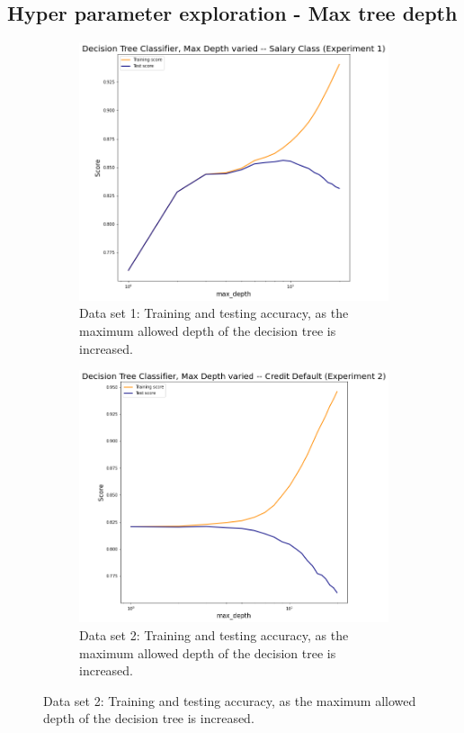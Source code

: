 \documentclass[
	letterpaper, %
]{IEEEtran}
\begin{document}
		\subsection{Hyper parameter exploration - Max tree depth}
		\begin{figure}[h]
			\begin{subfigure}{.5\textwidth}
				\centering
				\includegraphics[width=.8\linewidth]{./images/dtMaxDepth1.png}
				\caption{Data set 1: Training and testing accuracy, as the maximum allowed depth of the decision tree is increased.}
				\label{fig:dtDepth1}
			\end{subfigure}
			\begin{subfigure}{.5\textwidth}
				\centering
				\includegraphics[width=.8\linewidth]{./images/dtMaxDepth2.png}
				\caption{Data set 2: Training and testing accuracy, as the maximum allowed depth of the decision tree is increased.}
				\label{fig:dtDepth2}
			\end{subfigure}
		\end{figure}
\end{document}
